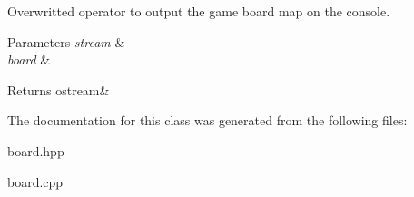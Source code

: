 Overwritted operator to output the game board map on the console. 


\begin{DoxyParams}{Parameters}
{\em stream} & \\
\hline
{\em board} & \\
\hline
\end{DoxyParams}
\begin{DoxyReturn}{Returns}
ostream\& 
\end{DoxyReturn}


The documentation for this class was generated from the following files\+:\begin{DoxyCompactItemize}
\item 
board.\+hpp\item 
board.\+cpp\end{DoxyCompactItemize}
